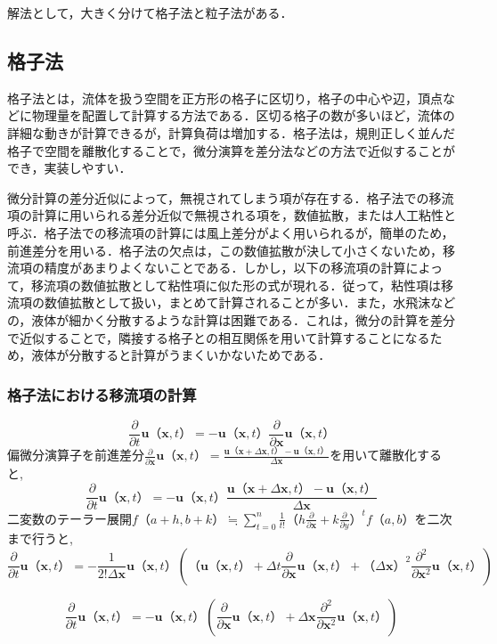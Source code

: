 \documentclass[a4j,12pt]{jreport}
\begin{document}
解法として，大きく分けて格子法と粒子法がある．

\subsection{格子法} \label{subsec:grid}
格子法とは，流体を扱う空間を正方形の格子に区切り，格子の中心や辺，頂点などに物理量を配置して計算する方法である．区切る格子の数が多いほど，流体の詳細な動きが計算できるが，計算負荷は増加する．格子法は，規則正しく並んだ格子で空間を離散化することで，微分演算を差分法などの方法で近似することができ，実装しやすい．

微分計算の差分近似によって，無視されてしまう項が存在する．格子法での移流項の計算に用いられる差分近似で無視される項を，数値拡散，または人工粘性と呼ぶ．格子法での移流項の計算には風上差分がよく用いられるが，簡単のため，前進差分を用いる．格子法の欠点は，この数値拡散が決して小さくないため，移流項の精度があまりよくないことである．しかし，以下の移流項の計算によって，移流項の数値拡散として粘性項に似た形の式が現れる．従って，粘性項は移流項の数値拡散として扱い，まとめて計算されることが多い．また，水飛沫などの，液体が細かく分散するような計算は困難である．これは，微分の計算を差分で近似することで，隣接する格子との相互関係を用いて計算することになるため，液体が分散すると計算がうまくいかないためである．

\subsubsection{格子法における移流項の計算} \label{subsec:gridadvect}
$$\frac{\partial}{\partial t}\bm{u}（\bm{x},t） = -\bm{u}（\bm{x},t）\frac{\partial}{\partial \bm{x}}\bm{u}（\bm{x},t）$$
偏微分演算子を前進差分$\frac{\partial}{\partial \bm{x}}\bm{u}（\bm{x},t） = \frac{\bm{u}（\bm{x}+\varDelta \bm{x},t） - \bm{u}（\bm{x},t）}{\varDelta \bm{x}}$を用いて離散化すると,
$$\frac{\partial}{\partial t}\bm{u}（\bm{x},t） =  -\bm{u}（\bm{x},t）\frac{\bm{u}（\bm{x}+\varDelta \bm{x},t） - \bm{u}（\bm{x},t）}{\varDelta \bm{x}}$$
二変数のテーラー展開$f（a+h,b+k） \fallingdotseq \sum\limits_{t=0}^n \frac{1}{t!}（h\frac{\partial}{\partial \bm{x}} + k\frac{\partial}{\partial y}）^t f（a,b）$を二次まで行うと,
$$\frac{\partial}{\partial t}\bm{u}（\bm{x},t） = -\frac{1}{2!\varDelta \bm{x}}\bm{u}（\bm{x},t）\left( （\bm{u}（\bm{x},t）+\varDelta t\frac{\partial}{\partial \bm{x}}\bm{u}（\bm{x},t） + （\varDelta \bm{x}）^2\frac{\partial^2}{\partial \bm{x}^2}\bm{u}（\bm{x},t） \right)$$
            
$$\frac{\partial}{\partial t}\bm{u}（\bm{x},t） =  -\bm{u}（\bm{x},t）\left(\frac{\partial}{\partial \bm{x}}\bm{u}（\bm{x},t） + \varDelta \bm{x}\frac{\partial^2}{\partial \bm{x}^2}\bm{u}（\bm{x},t） \right)$$
\end{document}
